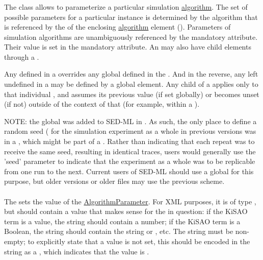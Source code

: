 \subsubsection{}
\label{class:algorithmParameter}
The  class allows to parameterize a particular simulation \hyperref[class:algorithm]{algorithm}. The set of possible parameters for a particular instance is determined by the algorithm that is referenced by the  of the enclosing \hyperref[class:algorithm]{algorithm} element (). Parameters of simulation algorithms are unambiguously referenced by the mandatory \hyperref[sec:kisaoid]{} attribute. Their value is set in the mandatory \hyperref[sec:algorithmParameterValue]{} attribute.  An \AlgorithmParameter may also have child \AlgorithmParameter elements through a \ListOfAlgorithmParameters.

Any \AlgorithmParameter defined in a \Simulation overrides any global \AlgorithmParameter defined in the \SedDocument.  And in the reverse, any \AlgorithmParameter left undefined in a \Simulation may be defined by a global \AlgorithmParameter element.  Any \AlgorithmParameter child of a \Simulation applies only to that individual \Simulation, and assumes its previous value (if set globally) or becomes unset (if not) outside of the context of that \Simulation (for example, within a \RepeatedTask).

NOTE:  the global \ListOfAlgorithmParameters was added to SED-ML in \currentLV.  As such, the only place to define a random seed ( for the simulation experiment as a whole in previous versions was in a \Simulation, which might be part of a \RepeatedTask.  Rather than indicating that each repeat was to receive the same seed, resulting in identical traces, users would generally use the 'seed' parameter to indicate that the experiment as a whole was to be replicable from one run to the next.  Current users of SED-ML should use a global \AlgorithmParameter for this purpose, but older versions or older files may use the previous scheme.

\paragraph*{}
\label{sec:algorithmParameterValue}
The  sets the value of the \hyperref[class:algorithmParameter]{AlgorithmParameter}.  For XML purposes, it is of type , but should contain a value that makes sense for the  in question:  if the KiSAO term is a value, the string should contain a number; if the KiSAO term is a Boolean, the string should contain the string  or , etc.  The string must be non-empty; to explicitly state that a value is not set, this should be encoded in the string as a , which indicates that the value is .

